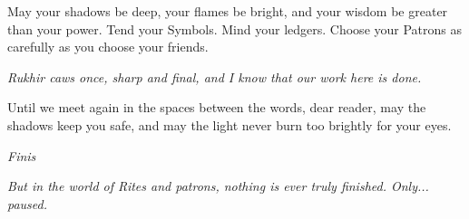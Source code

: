 \documentclass[12pt,twoside]{book}
\newcommand{\shadow}[1]{\textit{#1}}
\begin{document}
May your shadows be deep, your flames be bright, and your wisdom be greater than your power. Tend your Symbols. Mind your ledgers. Choose your Patrons as carefully as you choose your friends.

\shadow{Rukhir caws once, sharp and final, and I know that our work here is done.}

Until we meet again in the spaces between the words, dear reader, may the shadows keep you safe, and may the light never burn too brightly for your eyes.

\begin{center}
\textit{Finis}
\end{center}

\shadow{But in the world of Rites and patrons, nothing is ever truly finished. Only... paused.}
\end{document}
